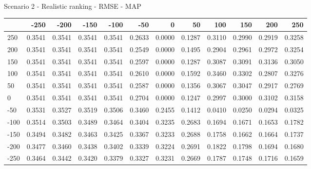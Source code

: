 Scenario 2 - Realistic ranking - RMSE - MAP
\begin{tabular}{lrrrrrrrrrrr}
\toprule
{} &   -250 &   -200 &   -150 &   -100 &   -50  &    0   &    50  &    100 &    150 &    200 &    250 \\
\midrule
 250 & 0.3541 & 0.3541 & 0.3541 & 0.3541 & 0.2633 & 0.0000 & 0.1287 & 0.3110 & 0.2990 & 0.2919 & 0.3258 \\
 200 & 0.3541 & 0.3541 & 0.3541 & 0.3541 & 0.2549 & 0.0000 & 0.1495 & 0.2904 & 0.2961 & 0.2972 & 0.3254 \\
 150 & 0.3541 & 0.3541 & 0.3541 & 0.3541 & 0.2597 & 0.0000 & 0.1287 & 0.3087 & 0.3091 & 0.3136 & 0.3050 \\
 100 & 0.3541 & 0.3541 & 0.3541 & 0.3541 & 0.2610 & 0.0000 & 0.1592 & 0.3460 & 0.3302 & 0.2807 & 0.3276 \\
 50  & 0.3541 & 0.3541 & 0.3541 & 0.3541 & 0.2587 & 0.0000 & 0.1356 & 0.3067 & 0.3047 & 0.2917 & 0.2769 \\
 0   & 0.3541 & 0.3541 & 0.3541 & 0.3541 & 0.2704 & 0.0000 & 0.1247 & 0.2997 & 0.3000 & 0.3102 & 0.3158 \\
-50  & 0.3531 & 0.3527 & 0.3519 & 0.3506 & 0.3460 & 0.2455 & 0.1412 & 0.0410 & 0.0250 & 0.0294 & 0.0325 \\
-100 & 0.3514 & 0.3503 & 0.3489 & 0.3464 & 0.3404 & 0.3235 & 0.2683 & 0.1694 & 0.1671 & 0.1653 & 0.1782 \\
-150 & 0.3494 & 0.3482 & 0.3463 & 0.3425 & 0.3367 & 0.3233 & 0.2688 & 0.1758 & 0.1662 & 0.1664 & 0.1737 \\
-200 & 0.3477 & 0.3460 & 0.3438 & 0.3402 & 0.3339 & 0.3224 & 0.2691 & 0.1822 & 0.1798 & 0.1694 & 0.1680 \\
-250 & 0.3464 & 0.3442 & 0.3420 & 0.3379 & 0.3327 & 0.3231 & 0.2669 & 0.1787 & 0.1748 & 0.1716 & 0.1659 \\
\bottomrule
\end{tabular}

